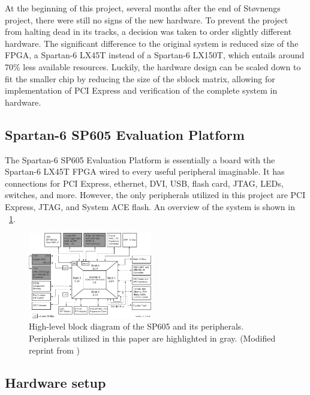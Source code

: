 At the beginning of this project, several months after the end of Støvnengs project, there were still no signs of the new hardware.
To prevent the project from halting dead in its tracks, a decision was taken to order slightly different hardware.
The significant difference to the original system is reduced size of the FPGA, a Spartan-6 LX45T instead of a Spartan-6 LX150T, which entails around 70\% less available resources.
Luckily, the hardware design can be scaled down to fit the smaller chip by reducing the size of the sblock matrix, allowing for implementation of PCI Express and verification of the complete system in hardware.

\subsection{Spartan-6 SP605 Evaluation Platform}

The Spartan-6 SP605 Evaluation Platform is essentially a board with the Spartan-6 LX45T FPGA wired to every useful peripheral imaginable.
It has connections for PCI Express, ethernet, DVI, USB, flash card, JTAG, LEDs, switches, and more.
However, the only peripherals utilized in this project are PCI Express, JTAG, and System ACE flash.
An overview of the system is shown in \figurename~\ref{fig:sp605}.

\begin{figure}[!ht]
    \centering
    \includegraphics[width=0.48\textwidth]{figures/sp605-modified}
    \caption{High-level block diagram of the SP605 and its peripherals. Peripherals utilized in this paper are highlighted in gray. (Modified reprint from \cite{ug526})}
    \label{fig:sp605}
\end{figure}




\subsection{Hardware setup}


